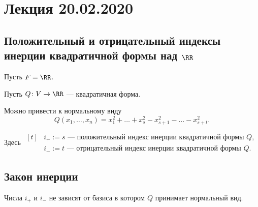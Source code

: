 \section{Лекция 20.02.2020}

\subsection{Положительный и отрицательный индексы инерции квадратичной формы над $\RR$}

Пусть $F = \RR$.

Пусть $Q \colon V \to \RR$ --- квадратичная форма.

Можно привести к нормальному виду
\begin{equation*}
    Q(x_1, \dots, x_n) = x_1^2 + \dots + x_s^2 - x_{s + 1}^2 - \dots - x_{s + t}^2
.\end{equation*}

Здесь
\begin{math}
    \begin{aligned}[t]
        &i_+ := s \text{ --- положительный индекс инерции квадратичной формы $Q$}, \\
        &i_- := t \text{ --- отрицательный индекс инерции квадратичной формы $Q$}.
    \end{aligned}
\end{math}


\subsection{Закон инерции}

\begin{theorem}
    Числа $i_+$ и $i_-$ не зависят от базиса в котором $Q$ принимает нормальный вид.
\end{theorem}

